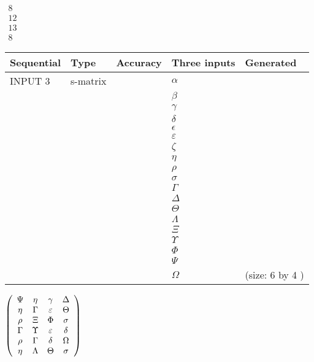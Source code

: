 \documentclass[12pt]{article}
\begin{document}
   
 $\begin{array}{
 c
 }
           8  \\ 
          12  \\ 
          13  \\ 
           8
\end{array}  $ 
  
  
\noindent\begin{tabular}{|l|l|l|l|l|}
\hline
 Sequential & Type & Accuracy & Three inputs & Generated \\ 
\hline
 
 
  INPUT $            3 $ & s-matrix & & 
 $  \alpha $ & 
  \\
  & & & 
 $  \beta $ & 
  \\
  & & & 
 $  \gamma $ & 
  \\
  & & & 
 $  \delta $ & 
  \\
  & & & 
 $  \epsilon $ & 
  \\
  & & & 
 $  \varepsilon $ & 
  \\
  & & & 
 $                     \zeta $ & 
  \\
  & & & 
 $  \eta $ & 
  \\
  & & & 
 $  \rho $ & 
  \\
  & & & 
 $  \sigma $ & 
  \\
  & & & 
 $  \Gamma $ & 
  \\
  & & & 
 $  \Delta $ & 
  \\
  & & & 
 $  \Theta $ & 
  \\
  & & & 
 $  \Lambda $ & 
  \\
  & & & 
 $                     \Xi $ & 
  \\
  & & & 
 $  \Upsilon $ & 
  \\
  & & & 
 $  \Phi $ & 
  \\
  & & & 
 $  \Psi $ & 
  \\
  & & & 
 $  \Omega $ & 
  (size:            6  by            4 )
 \\  \hline  
 \end{tabular}
   
   
 $  \left( \begin{array}
 {
 c
 c
 c
 c
 }
 \Psi & 
 \eta & 
 \gamma & 
 \Delta \\ 
 \eta & 
 \Gamma & 
 \varepsilon & 
 \Theta \\ 
 \rho & 
                    \Xi & 
 \Phi & 
 \sigma \\ 
 \Gamma & 
 \Upsilon & 
 \varepsilon & 
 \delta \\ 
 \rho & 
 \Gamma & 
 \delta & 
 \Omega \\ 
 \eta & 
 \Lambda & 
 \Theta & 
 \sigma
 \end{array} \right) $ 
  
\end{document}
